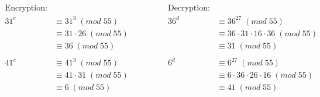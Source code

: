\documentclass{article}
\begin{document}
\begin{equation*}
    \begin{aligned}
        \text{Encryption:}                        \\
        31^e & \equiv 31^{3}      \; (mod \; 55)  \\
             & \equiv 31 \cdot 26 \; (mod \; 55)  \\
             & \equiv 36           \; (mod \; 55) \\
        \\
        41^e & \equiv 41^{3}      \; (mod \; 55)  \\
             & \equiv 41 \cdot 31 \; (mod \; 55)  \\
             & \equiv 6           \; (mod \; 55)  \\
    \end{aligned}
    \qquad \qquad
    \begin{aligned}
        \text{Decryption:}                                         \\
        36^d & \equiv 36^{27}                       \; (mod \; 55) \\
             & \equiv 36 \cdot 31 \cdot 16 \cdot 36 \; (mod \; 55) \\
             & \equiv 31                            \; (mod \; 55) \\
        \\
        6^d  & \equiv 6^{27}                       \; (mod \; 55)  \\
             & \equiv 6 \cdot 36 \cdot 26 \cdot 16 \; (mod \; 55)  \\
             & \equiv 41                            \; (mod \; 55) \\
    \end{aligned}
\end{equation*}
\end{document}

